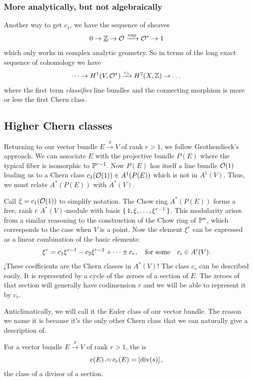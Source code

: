 \documentclass[12pt]{memoir}
\begin{document}
\subsubsection{More analytically, but not algebraically}
Another way to get $c_1$, we have the sequence of sheaves 
$$0\to\underline{\mathbb{Z}}\to\mathcal{O}\xrightarrow{\exp}\mathcal{O}^\ast\to 1$$
which only works in complex analytic geometry. So in terms of the long exact sequence of cohomology we have 
$$\dots\to H^1(V,\mathcal{O}^\ast)\xrightarrow{c_1}H^2(X,\mathbb{Z})\to\dots$$
where the first term \emph{classifies} line bundles and the connecting morphism is more or less the first Chern class. 

\subsection{Higher Chern classes}

Returning to our vector bundle $E\xrightarrow{\pi}V$ of rank $r>1$, we follow Grothendieck's approach. We can associate $E$ with the projective bundle $P(E)$ where the typical fiber is isomorphic to $\mathbb{P}^{r-1}$. Now $P(E)$ has itself a line bundle $\mathcal{O}(1)$ leading us to a Chern class $c_1(\mathcal{O}(1))\in A^1(P(E))$ which is not in $A^1(V)$. Thus, we must relate $A^\ast(P(E))$ with $A^\ast(V)$.\par
Call $\xi=c_1(\mathcal{O}(1))$ to simplify notation. The Chow ring $A^\ast(P(E))$ forms a free, rank $r$ $A^\ast(V)$-module with basis $\{\,1,\xi,\dots,\xi^{r-1}\,\}$. This modularity arises from a similar reasoning to the construction of the Chow ring of $\mathbb{P}^n$, which corresponds to the case when $V$ is a point. Now the element $\xi^r$ can be expressed as a linear combination of the basic elements: 
$$\xi^r=c_1\xi^{r-1}-c_2\xi^{r-2}+\dots\pm c_r,\quad\text{for some}\quad c_i\in A^i(V).$$
¡These coefficients are the Chern classes in $A^\ast(V)$! The class $c_r$ can be described easily. It is represented by a cycle of the zeroes of a section of $E$. The zeroes of that section will generally have codimension $r$ and we will be able to represent it by $c_r$.\par

Anticlimatically, we will call it the Euler class of our vector bundle. The reason we name it is because it's the only other Chern class that we can naturally give a description of.

\begin{Def}
    For a vector bundle $E\xrightarrow{\pi}V$ of rank $r>1$, the  is 
    $$e(E)\defeq c_r(E)=\bonj{\div(s)},$$
    the class of a divisor of a section.
\end{Def}
\end{document}
